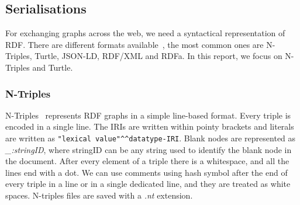 

\subsection{Serialisations}
For exchanging graphs across the web, we need a syntactical representation of RDF. There are different formats available~\cite{W3C2011}, the most common ones are N-Triples, Turtle, JSON-LD, RDF/XML and RDFa. In this report, we focus on N-Triples and Turtle.

\subsubsection*{N-Triples}
N-Triples~\cite{Beckett} represents RDF graphs in a simple line-based format. Every triple is encoded in a single line. The IRIs are written within pointy brackets and literals are written as \texttt{"lexical value"\textasciicircum \textasciicircum datatype-IRI}. Blank nodes are represented as \textit{\_:stringID}, where stringID can be any string used to identify the blank node in the document. After every element of a triple there is a whitespace, and all the lines end with a dot. We can use comments using hash symbol after the end of every triple in a line or in a single dedicated line, and they are treated as white spaces. N-triples files are saved with a \textit{.nt} extension.

